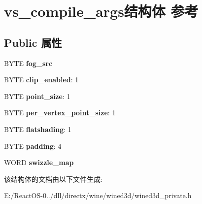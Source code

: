 \hypertarget{structvs__compile__args}{}\section{vs\+\_\+compile\+\_\+args结构体 参考}
\label{structvs__compile__args}
\subsection*{Public 属性}
\begin{DoxyCompactItemize}
\item 
\mbox{\label{structvs__compile__args_ace163e03e987b3751980104d1fe54efe}} 
B\+Y\+TE {\bfseries fog\+\_\+src}
\item 
\mbox{\label{structvs__compile__args_aaf366a5d8fc7b1673c46cf8f1d3d7bbf}} 
B\+Y\+TE {\bfseries clip\+\_\+enabled}\+: 1
\item 
\mbox{\label{structvs__compile__args_a68414a9ff2a33fd9584275072368c5b9}} 
B\+Y\+TE {\bfseries point\+\_\+size}\+: 1
\item 
\mbox{\label{structvs__compile__args_af77eecb12fe00c3ac01328cef5d89eb0}} 
B\+Y\+TE {\bfseries per\+\_\+vertex\+\_\+point\+\_\+size}\+: 1
\item 
\mbox{\label{structvs__compile__args_ae181e1458ae05a7eb0ef333bf88c30c5}} 
B\+Y\+TE {\bfseries flatshading}\+: 1
\item 
\mbox{\label{structvs__compile__args_aa5abaa674231758aafd6b22adbebe26c}} 
B\+Y\+TE {\bfseries padding}\+: 4
\item 
\mbox{\label{structvs__compile__args_a015d1e1c2ff7bc0a360aaba96261640c}} 
W\+O\+RD {\bfseries swizzle\+\_\+map}
\end{DoxyCompactItemize}


该结构体的文档由以下文件生成\+:\begin{DoxyCompactItemize}
\item 
E\+:/\+React\+O\+S-\/0../dll/directx/wine/wined3d/wined3d\+\_\+private.\+h\end{DoxyCompactItemize}

